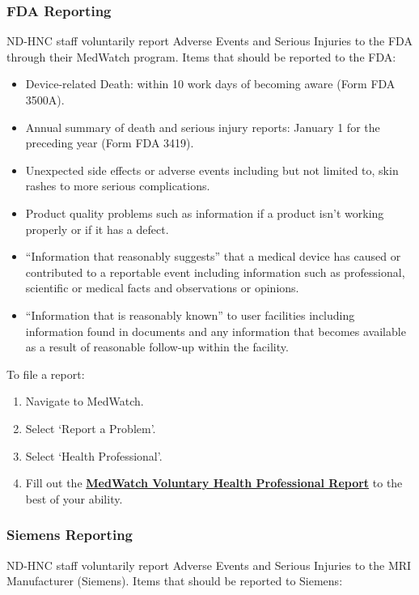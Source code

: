 \documentclass[11pt]{article}
\begin{document}
\subsubsection{FDA Reporting}
ND-HNC staff voluntarily report Adverse Events and Serious Injuries to the FDA through their MedWatch\cite{medwatch} program. Items that should be reported to the FDA:

\begin{itemize}
	\item Device-related Death: within 10 work days of becoming aware (Form FDA 3500A).
	\item Annual summary of death and serious injury reports: January 1 for the preceding year (Form FDA 3419).
	\item Unexpected side effects or adverse events including but not limited to, skin rashes to more serious complications.
	\item Product quality problems such as information if a product isn't working properly or if it has a defect.
	\item ``Information that reasonably suggests'' that a medical device has caused or contributed to a reportable event including information such as professional, scientific or medical facts and observations or opinions.
	\item ``Information that is reasonably known'' to user facilities including information found in documents and any information that becomes available as a result of reasonable follow-up within the facility.
\end{itemize}

To file a report:

\begin{enumerate}
	\item Navigate to MedWatch\cite{medwatch}.
	\item Select `Report a Problem'.
	\item Select `Health Professional'.
	\item Fill out the  \uline{\textbf{MedWatch Voluntary Health Professional Report}} to the best of your ability.
\end{enumerate}


\subsubsection{Siemens Reporting}
ND-HNC staff voluntarily report Adverse Events and Serious Injuries to the MRI Manufacturer (Siemens). Items that should be reported to Siemens:
\end{document}
